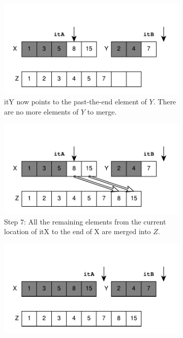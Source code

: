 \begin{figure}
	\begin{subfigure}[b]{0.45\textwidth}
		\centering
		\includegraphics[trim=0 0 0 45,clip,width=\textwidth]{sources/median_sorted_arrays/images/mergearrays6}
		\caption{ itY now  points to the past-the-end element of $Y$. There are no more elements of $Y$ to merge.}
		\label{fig:median_sorted_array:mergearray6}
	\end{subfigure}
	\hfill
	\begin{subfigure}[b]{0.45\textwidth}
		\centering
		\includegraphics[trim=0 0 0 45,clip,width=\textwidth]{sources/median_sorted_arrays/images/mergearrays7}
		\caption{Step $7$: All the remaining elements from the current location of itX to the end of X are merged into $Z$. }
		\label{fig:median_sorted_array:mergearray7}
	\end{subfigure}
	\hfill
	\begin{subfigure}[b]{0.45\textwidth}
		\centering
		\includegraphics[trim=0 0 0 45,clip,width=\textwidth]{sources/median_sorted_arrays/images/mergearrays8}

\end{subfigure}
\end{figure}
